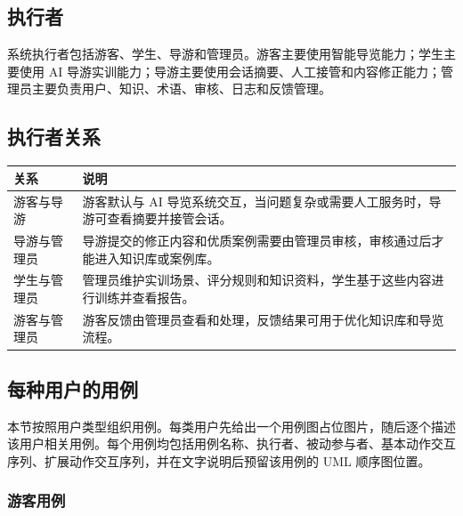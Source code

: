 \subsection{执行者}

系统执行者包括游客、学生、导游和管理员。游客主要使用智能导览能力；学生主要使用 AI 导游实训能力；导游主要使用会话摘要、人工接管和内容修正能力；管理员主要负责用户、知识、术语、审核、日志和反馈管理。

\subsection{执行者关系}

\begin{longtable}{p{3cm}p{10.4cm}}
\toprule
关系 & 说明 \\
\midrule
游客与导游 & 游客默认与 AI 导览系统交互，当问题复杂或需要人工服务时，导游可查看摘要并接管会话。 \\
导游与管理员 & 导游提交的修正内容和优质案例需要由管理员审核，审核通过后才能进入知识库或案例库。 \\
学生与管理员 & 管理员维护实训场景、评分规则和知识资料，学生基于这些内容进行训练并查看报告。 \\
游客与管理员 & 游客反馈由管理员查看和处理，反馈结果可用于优化知识库和导览流程。 \\
\bottomrule
\end{longtable}

\subsection{每种用户的用例}

本节按照用户类型组织用例。每类用户先给出一个用例图占位图片，随后逐个描述该用户相关用例。每个用例均包括用例名称、执行者、被动参与者、基本动作交互序列、扩展动作交互序列，并在文字说明后预留该用例的 UML 顺序图位置。

\subsubsection{游客用例}


